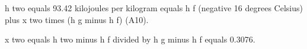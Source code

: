 h two equals 93.42 kilojoules per kilogram equals h f (negative 16 degrees Celsius) plus x two times (h g minus h f) (A10).  

x two equals h two minus h f divided by h g minus h f equals 0.3076.